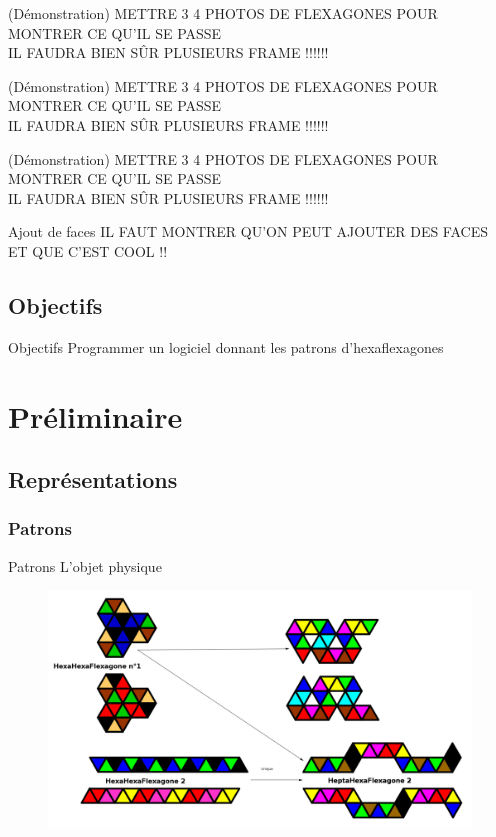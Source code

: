 \documentclass[french,xcolor=dvipsnames]{beamer}
\begin{document}
		\begin{frame}{(Démonstration)}
			METTRE 3 4 PHOTOS DE FLEXAGONES POUR MONTRER CE QU'IL SE PASSE\\
			IL FAUDRA BIEN SÛR PLUSIEURS FRAME !!!!!!
		\end{frame}
		
		\begin{frame}{(Démonstration)}
			METTRE 3 4 PHOTOS DE FLEXAGONES POUR MONTRER CE QU'IL SE PASSE\\
			IL FAUDRA BIEN SÛR PLUSIEURS FRAME !!!!!!
		\end{frame}
		
		\begin{frame}{(Démonstration)}
			METTRE 3 4 PHOTOS DE FLEXAGONES POUR MONTRER CE QU'IL SE PASSE\\
			IL FAUDRA BIEN SÛR PLUSIEURS FRAME !!!!!!
		\end{frame}
		
		\begin{frame}{Ajout de faces}
		IL FAUT MONTRER QU'ON PEUT AJOUTER DES FACES ET QUE C'EST COOL !!
		\end{frame}
		
		\subsection{Objectifs}
		\begin{frame}{Objectifs}
			Programmer un logiciel donnant les patrons d'hexaflexagones
		\end{frame}
		
		
	\section{Préliminaire}
	
		\subsection{Représentations}
		
		\subsubsection{Patrons}
		\begin{frame}{Patrons}
			L'objet physique
			\begin{figure}
				\includegraphics[scale=0.19]{exemples_patrons.png}
			\end{figure}
		\end{frame}
		
\end{document}
